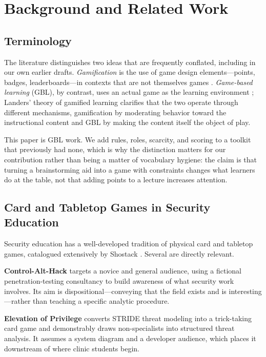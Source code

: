 \documentclass[10pt,twocolumn,letterpaper]{article}
\begin{document}
\section{Background and Related Work}
\label{sec:background}

\subsection{Terminology}

The literature distinguishes two ideas that are frequently conflated, including
in our own earlier drafts. \emph{Gamification} is the use of game design
elements---points, badges, leaderboards---in contexts that are not themselves
games \cite{deterding2011gamification}. \emph{Game-based learning} (GBL), by
contrast, uses an actual game as the learning environment
\cite{plass2015gbl}; Landers' theory of gamified learning
\cite{landers2014gamified} clarifies that the two operate through different
mechanisms, gamification by moderating behavior toward the instructional
content and GBL by making the content itself the object of play.

This paper is GBL work. We add rules, roles, scarcity, and scoring to a toolkit
that previously had none, which is why the distinction matters for our
contribution rather than being a matter of vocabulary hygiene: the claim is
that turning a brainstorming aid into a game with constraints changes what
learners do at the table, not that adding points to a lecture increases
attention.

\subsection{Card and Tabletop Games in Security Education}

Security education has a well-developed tradition of physical card and tabletop
games, catalogued extensively by Shostack \cite{shostack_games}. Several are
directly relevant.

\textbf{Control-Alt-Hack} \cite{denning2013controlalthack} targets a novice and
general audience, using a fictional penetration-testing consultancy to build
awareness of what security work involves. Its aim is dispositional---conveying
that the field exists and is interesting---rather than teaching a specific
analytic procedure.

\textbf{Elevation of Privilege} \cite{shostack2014eop} converts STRIDE threat
modeling into a trick-taking card game and demonstrably draws non-specialists
into structured threat analysis. It assumes a system diagram and a developer
audience, which places it downstream of where clinic students begin.
\end{document}

